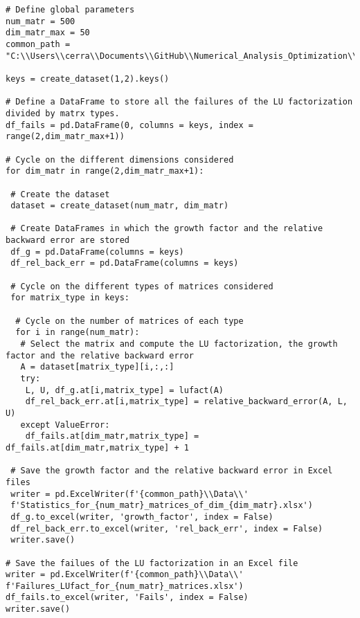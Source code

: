 \documentclass[a4paper,11pt]{report}
\begin{document}
\begin{verbatim}
# Define global parameters
num_matr = 500
dim_matr_max = 50
common_path = "C:\\Users\\cerra\\Documents\\GitHub\\Numerical_Analysis_Optimization\\Project_1"

keys = create_dataset(1,2).keys()

# Define a DataFrame to store all the failures of the LU factorization divided by matrx types.
df_fails = pd.DataFrame(0, columns = keys, index = range(2,dim_matr_max+1))

# Cycle on the different dimensions considered
for dim_matr in range(2,dim_matr_max+1):

 # Create the dataset
 dataset = create_dataset(num_matr, dim_matr)

 # Create DataFrames in which the growth factor and the relative backward error are stored
 df_g = pd.DataFrame(columns = keys)
 df_rel_back_err = pd.DataFrame(columns = keys)

 # Cycle on the different types of matrices considered
 for matrix_type in keys:

  # Cycle on the number of matrices of each type 
  for i in range(num_matr):
   # Select the matrix and compute the LU factorization, the growth factor and the relative backward error
   A = dataset[matrix_type][i,:,:]
   try:
    L, U, df_g.at[i,matrix_type] = lufact(A)
    df_rel_back_err.at[i,matrix_type] = relative_backward_error(A, L, U)
   except ValueError:
    df_fails.at[dim_matr,matrix_type] = df_fails.at[dim_matr,matrix_type] + 1

 # Save the growth factor and the relative backward error in Excel files
 writer = pd.ExcelWriter(f'{common_path}\\Data\\'
 f'Statistics_for_{num_matr}_matrices_of_dim_{dim_matr}.xlsx')
 df_g.to_excel(writer, 'growth_factor', index = False)
 df_rel_back_err.to_excel(writer, 'rel_back_err', index = False)
 writer.save()

# Save the failues of the LU factorization in an Excel file
writer = pd.ExcelWriter(f'{common_path}\\Data\\'
f'Failures_LUfact_for_{num_matr}_matrices.xlsx')
df_fails.to_excel(writer, 'Fails', index = False)
writer.save()
\end{verbatim}
\end{document}
